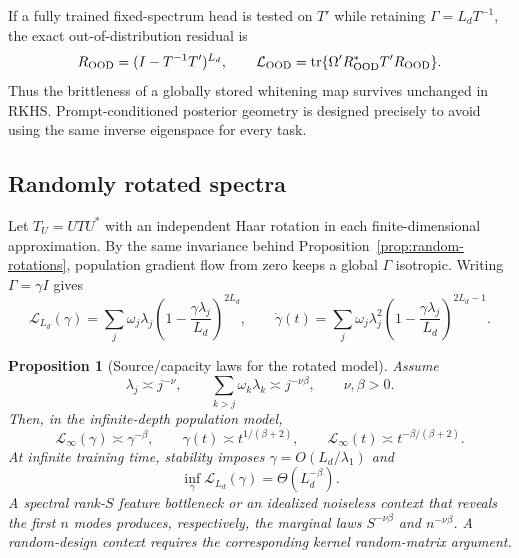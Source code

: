 \documentclass[11pt,a4paper]{article}
\numberwithin{equation}{section}
\newtheorem{proposition}[theorem]{Proposition}
\theoremstyle{definition}
\theoremstyle{remark}
\newcommand{\loss}{\mathcal L}
\newcommand{\tr}{\operatorname{tr}}
\begin{document}
If a fully trained fixed-spectrum head is tested on $T'$ while retaining
$\Gamma=L_dT^{-1}$, the exact out-of-distribution residual is
\begin{equation}
 R_{\rm OOD}=(I-T^{-1}T')^{L_d},
 \qquad
 \loss_{\rm OOD}
 =\tr\{\Omega'R_{\rm OOD}^*T'R_{\rm OOD}\}.
 \label{eq:fs-ood}
\end{equation}
Thus the brittleness of a globally stored whitening map survives unchanged in
RKHS.  Prompt-conditioned posterior geometry is designed precisely to avoid
using the same inverse eigenspace for every task.

\subsection{Randomly rotated spectra}

Let $T_U=UTU^*$ with an independent Haar rotation in each finite-dimensional
approximation.  By the same invariance behind
Proposition~\ref{prop:random-rotations}, population gradient flow from zero
keeps a global $\Gamma$ isotropic.  Writing $\Gamma=\gamma I$ gives
\begin{equation}
 \loss_{L_d}(\gamma)
 =\sum_j\omega_j\lambda_j
 \left(1-\frac{\gamma\lambda_j}{L_d}\right)^{2L_d},
 \qquad
 \dot\gamma(t)
 =\sum_j\omega_j\lambda_j^2
 \left(1-\frac{\gamma\lambda_j}{L_d}\right)^{2L_d-1}.
 \label{eq:rrs-scalar-flow}
\end{equation}

\begin{proposition}[Source/capacity laws for the rotated model]
\label{prop:rrs-laws}
Assume
\begin{equation}
 \lambda_j\asymp j^{-\nu},
 \qquad
 \sum_{k>j}\omega_k\lambda_k\asymp j^{-\nu\beta},
 \qquad \nu,\beta>0.
 \label{eq:rrs-source-capacity}
\end{equation}
Then, in the infinite-depth population model,
\begin{equation}
 \loss_\infty(\gamma)\asymp\gamma^{-\beta},
 \qquad
 \gamma(t)\asymp t^{1/(\beta+2)},
 \qquad
 \loss_\infty(t)\asymp t^{-\beta/(\beta+2)}.
 \label{eq:rrs-time-law}
\end{equation}
At infinite training time, stability imposes
$\gamma=O(L_d/\lambda_1)$ and
\begin{equation}
 \inf_\gamma\loss_{L_d}(\gamma)
 =\Theta(L_d^{-\beta}).
 \label{eq:rrs-depth-law}
\end{equation}
A spectral rank-$S$ feature bottleneck or an idealized noiseless context that
reveals the first $n$ modes produces, respectively, the marginal laws
$S^{-\nu\beta}$ and $n^{-\nu\beta}$.  A random-design context requires the
corresponding kernel random-matrix argument.
\end{proposition}
\end{document}
